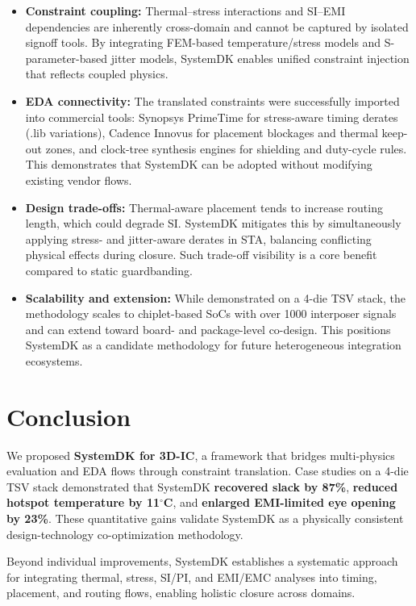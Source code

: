 \documentclass[conference]{IEEEtran}
\begin{document}
\begin{itemize}
  \item \textbf{Constraint coupling:}  
  Thermal–stress interactions and SI–EMI dependencies are inherently cross-domain
  and cannot be captured by isolated signoff tools.
  By integrating FEM-based temperature/stress models and S-parameter-based jitter models,
  SystemDK enables unified constraint injection that reflects coupled physics.

  \item \textbf{EDA connectivity:}  
  The translated constraints were successfully imported into commercial tools:
  Synopsys PrimeTime for stress-aware timing derates (.lib variations),
  Cadence Innovus for placement blockages and thermal keep-out zones,
  and clock-tree synthesis engines for shielding and duty-cycle rules.
  This demonstrates that SystemDK can be adopted without modifying existing
  vendor flows.

  \item \textbf{Design trade-offs:}  
  Thermal-aware placement tends to increase routing length, which could degrade SI.
  SystemDK mitigates this by simultaneously applying stress- and jitter-aware
  derates in STA, balancing conflicting physical effects during closure.
  Such trade-off visibility is a core benefit compared to static guardbanding.

  \item \textbf{Scalability and extension:}  
  While demonstrated on a 4-die TSV stack, the methodology scales to
  chiplet-based SoCs with over 1000 interposer signals and can extend toward
  board- and package-level co-design. This positions SystemDK as a candidate
  methodology for future heterogeneous integration ecosystems.
\end{itemize}

\section{Conclusion}
We proposed \textbf{SystemDK for 3D-IC}, a framework that bridges multi-physics
evaluation and EDA flows through constraint translation.
Case studies on a 4-die TSV stack demonstrated that SystemDK
\textbf{recovered slack by 87\%},
\textbf{reduced hotspot temperature by 11$^\circ$C},
and \textbf{enlarged EMI-limited eye opening by 23\%}.
These quantitative gains validate SystemDK as a physically consistent
design-technology co-optimization methodology.

Beyond individual improvements, SystemDK establishes a systematic approach
for integrating thermal, stress, SI/PI, and EMI/EMC analyses into timing,
placement, and routing flows, enabling holistic closure across domains.
\end{document}
